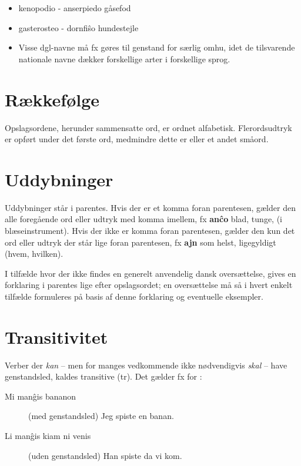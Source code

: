 \begin{description}[style=multiline,nosep,itemsep=3ex,itemindent=0.5cm]
	\begin{itemize}[leftmargin=4em, align=left]
		\item kenopodi{\textbar}o - anser{\textbar}pied{\textbar}o   g{\aa}sefod
		\item gasteroste{\textbar}o - dorn{\textbar}fi\^s{\textbar}o hundestejle
		\item Visse dgl-navne m{\aa} fx g{\o}res til genstand for s{\ae}rlig omhu,
		idet de tilsvarende nationale navne d{\ae}kker forskellige arter i
		forskellige sprog.
	\end{itemize}

\end{description}

\section{R{\ae}kkef{\o}lge}

Opslagsordene, herunder sammensatte ord, er ordnet alfabetisk.
Flerordsudtryk er opf{\o}rt under det f{\o}rste ord, medmindre dette er
 eller et andet sm{\aa}ord.

\section{Uddybninger}

Uddybninger st{\aa}r i parentes. Hvis der er et komma foran parentesen,
g{\ae}lder den alle foreg{\aa}ende ord eller udtryk med komma imellem,
fx \textbf{an\^co} blad, tunge, (i bl{\ae}seinstrument). Hvis der ikke
er komma foran parentesen, g{\ae}lder den kun det ord eller udtryk der
st{\aa}r lige foran parentesen, fx \textbf{ajn} som helst, ligegyldigt
(hvem, hvilken).

I tilf{\ae}lde hvor der ikke findes en generelt anvendelig dansk
overs{\ae}ttelse, gives en forklaring i parentes lige efter
opslagsordet; en overs{\ae}ttelse m{\aa} s{\aa} i hvert enkelt
tilf{\ae}lde formuleres p{\aa} basis af denne forklaring og eventuelle
eksempler.


\section{Transitivitet}
Verber der \textit{kan} -- men for manges vedkommende ikke n{\o}dvendigvis \textit{skal} -- have genstandsled, kaldes transitive (tr). Det g{\ae}lder fx for :

\begin{description}
	\item[Mi man\^gis bananon] (med genstandsled) Jeg spiste en banan.
	\item[Li man\^gis kiam ni venis] (uden genstandsled) Han spiste da vi kom.
\end{description}

